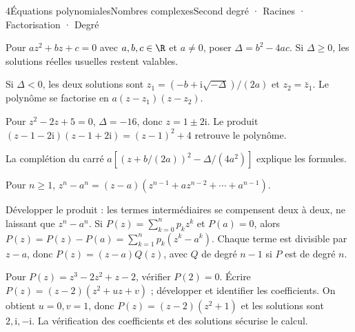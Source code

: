 \begin{ouverture}[courbe]{4}{Équations polynomiales}{Nombres complexes}{Second degré · Racines · Factorisation · Degré}
\end{ouverture}
\essentiel

Pour $az^2+bz+c=0$ avec $a,b,c\in\R$ et $a\ne0$, poser $\Delta=b^2-4ac$.
Si $\Delta\geq0$, les solutions réelles usuelles restent valables.
\begin{propriete}
Si $\Delta<0$, les deux solutions sont
$z_1=(-b+\mathrm i\sqrt{-\Delta})/(2a)$ et $z_2=\bar z_1$.
Le polynôme se factorise en $a(z-z_1)(z-z_2)$.
\end{propriete}
\begin{exemple}
Pour $z^2-2z+5=0$, $\Delta=-16$, donc $z=1\pm2\mathrm i$.
Le produit $(z-1-2\mathrm i)(z-1+2\mathrm i)=(z-1)^2+4$ retrouve le polynôme.
\end{exemple}
La complétion du carré $a[(z+b/(2a))^2-\Delta/(4a^2)]$ explique les formules.
\begin{theoreme}
Pour $n\geq1$,
$z^n-a^n=(z-a)(z^{n-1}+az^{n-2}+\cdots+a^{n-1})$.
\end{theoreme}
\begin{demonstration}
Développer le produit : les termes intermédiaires se compensent deux à deux, ne laissant que $z^n-a^n$.
Si $P(z)=\sum_{k=0}^np_kz^k$ et $P(a)=0$, alors
$P(z)=P(z)-P(a)=\sum_{k=1}^np_k(z^k-a^k)$.
Chaque terme est divisible par $z-a$, donc $P(z)=(z-a)Q(z)$, avec $Q$ de degré $n-1$ si $P$ est de degré $n$.
\end{demonstration}
\begin{savoirfaire}
Pour $P(z)=z^3-2z^2+z-2$, vérifier $P(2)=0$.
Écrire $P(z)=(z-2)(z^2+uz+v)$ ; développer et identifier les coefficients.
On obtient $u=0,v=1$, donc $P(z)=(z-2)(z^2+1)$ et les solutions sont $2,\mathrm i,-\mathrm i$.
La vérification des coefficients et des solutions sécurise le calcul.
\end{savoirfaire}
